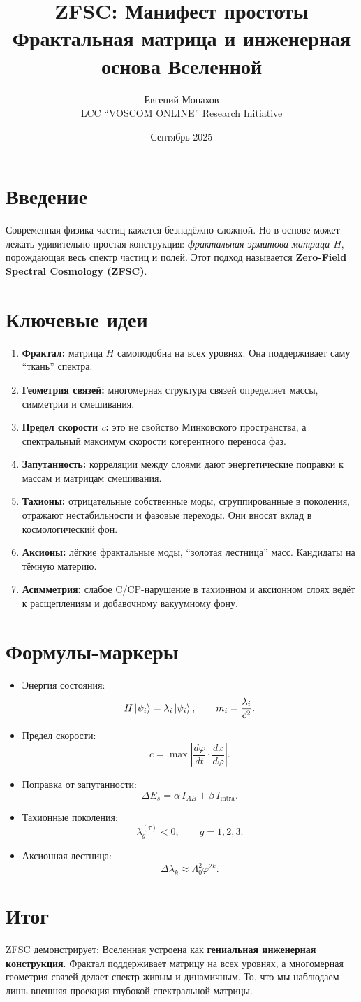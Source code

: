\documentclass[12pt,a4paper]{article}
\title{ZFSC: Манифест простоты \\
Фрактальная матрица и инженерная основа Вселенной}
\author{Евгений Монахов \\ LCC ``VOSCOM ONLINE'' Research Initiative}
\date{Сентябрь 2025}
\begin{document}
\maketitle

\section*{Введение}
Современная физика частиц кажется безнадёжно сложной. Но в основе может лежать удивительно простая конструкция: \emph{фрактальная эрмитова матрица $H$}, порождающая весь спектр частиц и полей.  
Этот подход называется \textbf{Zero-Field Spectral Cosmology (ZFSC)}.

\section*{Ключевые идеи}
\begin{enumerate}
  \item \textbf{Фрактал:} матрица $H$ самоподобна на всех уровнях. Она поддерживает саму ``ткань'' спектра.
  \item \textbf{Геометрия связей:} многомерная структура связей определяет массы, симметрии и смешивания.
  \item \textbf{Предел скорости $c$:} это не свойство Минковского пространства, а спектральный максимум скорости когерентного переноса фаз.
  \item \textbf{Запутанность:} корреляции между слоями дают энергетические поправки к массам и матрицам смешивания.
  \item \textbf{Тахионы:} отрицательные собственные моды, сгруппированные в поколения, отражают нестабильности и фазовые переходы. Они вносят вклад в космологический фон.
  \item \textbf{Аксионы:} лёгкие фрактальные моды, ``золотая лестница'' масс. Кандидаты на тёмную материю.
  \item \textbf{Асимметрия:} слабое C/CP-нарушение в тахионном и аксионном слоях ведёт к расщеплениям и добавочному вакуумному фону.
\end{enumerate}

\section*{Формулы-маркеры}
\begin{itemize}
  \item Энергия состояния:
  \[
  H\ket{\psi_i}=\lambda_i\ket{\psi_i},\qquad m_i=\frac{\lambda_i}{c^2}.
  \]
  \item Предел скорости:
  \[
  c=\max\left|\frac{d\varphi}{dt}\cdot\frac{dx}{d\varphi}\right|.
  \]
  \item Поправка от запутанности:
  \[
  \Delta E_s=\alpha\,I_{AB}+\beta\,I_{\text{intra}}.
  \]
  \item Тахионные поколения:
  \[
  \lambda^{(\tau)}_g<0,\qquad g=1,2,3.
  \]
  \item Аксионная лестница:
  \[
  \Delta\lambda_k\approx \Lambda_0^2\varphi^{2k}.
  \]
\end{itemize}

\section*{Итог}
ZFSC демонстрирует: Вселенная устроена как \textbf{гениальная инженерная конструкция}.  
Фрактал поддерживает матрицу на всех уровнях, а многомерная геометрия связей делает спектр живым и динамичным.  
То, что мы наблюдаем --- лишь внешняя проекция глубокой спектральной матрицы.
\end{document}
